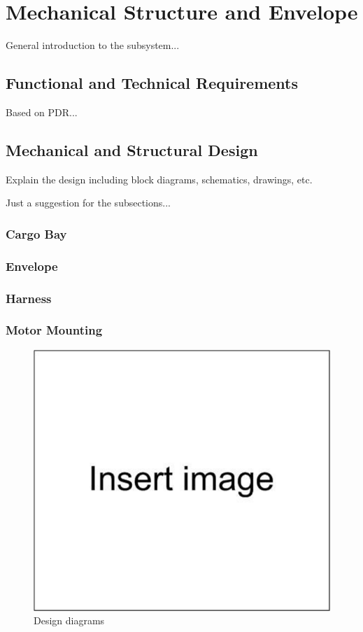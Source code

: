 \chapter{Mechanical Structure and Envelope}
\label{chap:mse}

General introduction to the subsystem...

\section{Functional and Technical Requirements}

Based on PDR...

\section{Mechanical and Structural Design}

Explain the design including block diagrams, schematics, drawings, etc.

Just a suggestion for the subsections...

\subsection{Cargo Bay}

\subsection{Envelope}

\subsection{Harness}

\subsection{Motor Mounting}

\begin{figure}[bht]
\centering
\includegraphics[scale=0.5]{figures/Drawing1}
\caption{Design diagrams}
\label{fig:some_reference}
\end{figure}

